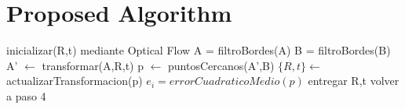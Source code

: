 \section{Proposed Algorithm}
\begin{algorithmic}[1]
\State inicializar(R,t) mediante Optical Flow
\State A = filtroBordes(A)
\State B = filtroBordes(B)
\State A' $\leftarrow$ transformar(A,R,t) 
\State p $\leftarrow$ puntosCercanos(A',B)
\State $\{R,t\} \gets$ actualizarTransformacion(p)
\State $e_i = errorCuadraticoMedio(p)$
	\State entregar R,t
\Else
	\State volver a paso 4
\EndIf
\end{algorithmic}
